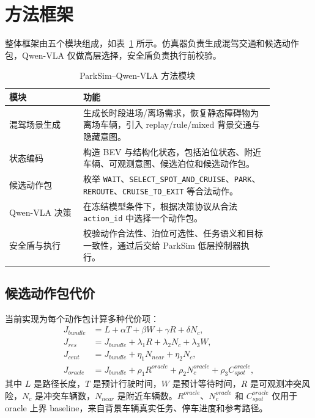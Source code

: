 \documentclass[conference]{IEEEtran}
\begin{document}
\section{方法框架}
整体框架由五个模块组成，如表~\ref{tab:modules} 所示。仿真器负责生成混驾交通和候选动作包，Qwen-VLA 仅做高层选择，安全盾负责执行前校验。

\begin{table}[htbp]
\caption{ParkSim--Qwen-VLA 方法模块}
\label{tab:modules}
\centering
\begin{tabular}{p{0.24\linewidth}p{0.62\linewidth}}
\toprule
模块 & 功能 \\
\midrule
混驾场景生成 & 生成长时段进场/离场需求，恢复静态障碍物为离场车辆，引入 replay/rule/mixed 背景交通与隐藏意图。 \\
状态编码 & 构造 BEV 与结构化状态，包括泊位状态、附近车辆、可观测意图、候选泊位和候选动作包。 \\
候选动作包 & 枚举 \texttt{WAIT}、\texttt{SELECT\_SPOT\_AND\_CRUISE}、\texttt{PARK}、\texttt{REROUTE}、\texttt{CRUISE\_TO\_EXIT} 等合法动作。 \\
Qwen-VLA 决策 & 在冻结模型条件下，根据决策协议从合法 \texttt{action\_id} 中选择一个动作包。 \\
安全盾与执行 & 校验动作合法性、泊位可选性、任务语义和目标一致性，通过后交给 ParkSim 低层控制器执行。 \\
\bottomrule
\end{tabular}
\end{table}

\subsection{候选动作包代价}
当前实现为每个动作包计算多种代价项：
\begin{align}
    J_{bundle} &= L + \alpha T + \beta W + \gamma R + \delta N_c, \\
    J_{res} &= J_{bundle} + \lambda_1 R + \lambda_2 N_c + \lambda_3 W, \\
    J_{cent} &= J_{bundle} + \eta_1 N_{near} + \eta_2 N_c, \\
    J_{oracle} &= J_{bundle} + \rho_1 R^{oracle} + \rho_2 N_c^{oracle} + \rho_3 C_{spot}^{oracle},
\end{align}
其中 $L$ 是路径长度，$T$ 是预计行驶时间，$W$ 是预计等待时间，$R$ 是可观测冲突风险，$N_c$ 是冲突车辆数，$N_{near}$ 是附近车辆数。$R^{oracle}$、$N_c^{oracle}$ 和 $C_{spot}^{oracle}$ 仅用于 oracle 上界 baseline，来自背景车辆真实任务、停车进度和参考路径。
\end{document}
